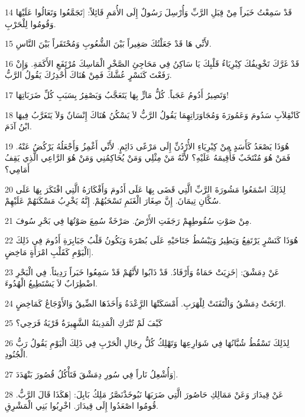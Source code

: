 \par 14 قَدْ سَمِعْتُ خَبَراً مِنْ قِبَلِ الرَّبِّ وَأُرْسِلَ رَسُولٌ إِلَى الأُمَمِ قَائِلاً: [تَجَمَّعُوا وَتَعَالُوا عَلَيْهَا وَقُومُوا لِلْحَرْبِ.
\par 15 لأَنِّي هَا قَدْ جَعَلْتُكَ صَغِيراً بَيْنَ الشُّعُوبِ وَمُحْتَقَراً بَيْنَ النَّاسِ.
\par 16 قَدْ غَرَّكَ تَخْوِيفُكَ كِبْرِيَاءُ قَلْبِكَ يَا سَاكِنُ فِي مَحَاجِئِ الصَّخْرِ الْمَاسِكَ مُرْتَفَعِ الأَكَمَةِ. وَإِنْ رَفَعْتَ كَنَسْرٍ عُشَّكَ فَمِنْ هُنَاكَ أُحْدِرُكَ يَقُولُ الرَّبُّ.
\par 17 وَتَصِيرُ أَدُومُ عَجَباً. كُلُّ مَارٍّ بِهَا يَتَعَجَّبُ وَيَصْفِرُ بِسَبَبِ كُلِّ ضَرَبَاتِهَا!
\par 18 كَانْقِلاَبِ سَدُومَ وَعَمُورَةَ وَمُجَاوَرَاتِهِمَا يَقُولُ الرَّبُّ لاَ يَسْكُنُ هُنَاكَ إِنْسَانٌ وَلاَ يَتَغَرَّبُ فِيهَا ابْنُ آدَمَ.
\par 19 هُوَذَا يَصْعَدُ كَأَسَدٍ مِنْ كِبْرِيَاءِ الأُرْدُنِّ إِلَى مَرْعًى دَائِمٍ. لأَنِّي أَغْمِزُ وَأَجْعَلُهُ يَرْكُضُ عَنْهُ. فَمَنْ هُوَ مُنْتَخَبٌ فَأُقِيمَهُ عَلَيْهِ؟ لأَنَّهُ مَنْ مِثْلِي وَمَنْ يُحَاكِمُنِي وَمَنْ هُوَ الرَّاعِي الَّذِي يَقِفُ أَمَامِي؟
\par 20 لِذَلِكَ اسْمَعُوا مَشُورَةَ الرَّبِّ الَّتِي قَضَى بِهَا عَلَى أَدُومَ وَأَفْكَارَهُ الَّتِي افْتَكَرَ بِهَا عَلَى سُكَّانِ تِيمَانَ. إِنَّ صِغَارَ الْغَنَمِ تَسْحَبُهُمْ. إِنَّهُ يَخْرِبُ مَسْكَنَهُمْ عَلَيْهِمْ.
\par 21 مِنْ صَوْتِ سُقُوطِهِمْ رَجَفَتِ الأَرْضُ. صَرْخَةٌ سُمِعَ صَوْتُهَا فِي بَحْرِ سُوفَ.
\par 22 هُوَذَا كَنَسْرٍ يَرْتَفِعُ وَيَطِيرُ وَيَبْسُطُ جَنَاحَيْهِ عَلَى بُصْرَةَ وَيَكُونُ قَلْبُ جَبَابِرَةِ أَدُومَ فِي ذَلِكَ الْيَوْمِ كَقَلْبِ امْرَأَةٍ مَاخِضٍ].
\par 23 عَنْ دِمَشْقَ: [خَزِيَتْ حَمَاةُ وَأَرْفَادُ. قَدْ ذَابُوا لأَنَّهُمْ قَدْ سَمِعُوا خَبَراً رَدِيئاً. فِي الْبَحْرِ اضْطِرَابٌ لاَ يَسْتَطِيعُ الْهُدُوءَ.
\par 24 ارْتَخَتْ دِمَشْقُ وَالْتَفَتَتْ لِلْهَرَبِ. أَمْسَكَتْهَا الرَِّعْدَةُ وَأَخَذَهَا الضِّيقُ وَالأَوْجَاعُ كَمَاخِضٍ.
\par 25 كَيْفَ لَمْ تُتْرَكِ الْمَدِينَةُ الشَّهِيرَةُ قَرْيَةُ فَرَحِي؟
\par 26 لِذَلِكَ تَسْقُطُ شُبَّانُهَا فِي شَوَارِعِهَا وَتَهْلِكُ كُلُّ رِجَالِ الْحَرْبِ فِي ذَلِكَ الْيَوْمِ يَقُولُ رَبُّ الْجُنُودِ.
\par 27 وَأُشْعِلُ نَاراً فِي سُورِ دِمَشْقَ فَتَأْكُلُ قُصُورَ بَنْهَدَدَ].
\par 28 عَنْ قِيدَارَ وَعَنْ مَمَالِكِ حَاصُورَ الَّتِي ضَرَبَهَا نَبُوخَذْنَصَّرُ مَلِكُ بَابِلَ: [هَكَذَا قَالَ الرَّبُّ. قُومُوا اصْعَدُوا إِلَى قِيدَارَ. اخْرِبُوا بَنِي الْمَشْرِقِ.

